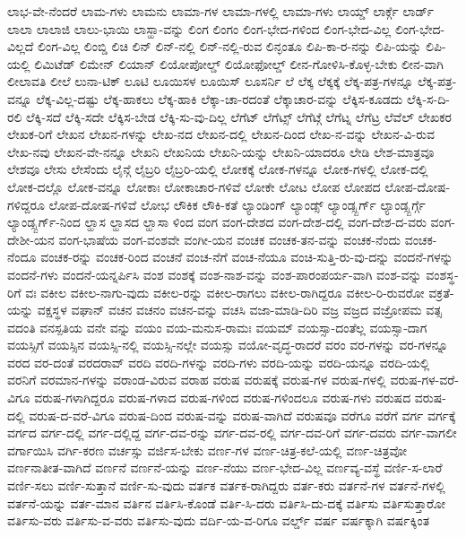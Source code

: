 {ಲಾಭ-ವೇ-ನೆಂದರೆ
ಲಾಮ-ಗಳು
ಲಾಮನು
ಲಾಮಾ-ಗಳ
ಲಾಮಾ-ಗಳಲ್ಲಿ
ಲಾಮಾ-ಗಳು
ಲಾಯ್ಡ್
ಲಾರ್ಕ್ಗೆ
ಲಾರ್ಡ್
ಲಾಲಾ
ಲಾಲಾಜಿ
ಲಾಲು-ಭಾಯಿ
ಲಾಸ್ಹಾ-ವನ್ನು
ಲಿಂಗ
ಲಿಂಗಂ
ಲಿಂಗ-ಭೇದ-ಗಳಿಂದ
ಲಿಂಗ-ಭೇದ-ವಿಲ್ಲ
ಲಿಂಗ-ಭೇದ-ವಿಲ್ಲದೆ
ಲಿಂಗ-ವಿಲ್ಲ
ಲಿಂಬ್ಡಿ
ಲಿಚಿ
ಲಿನ್
ಲಿನ್-ನಲ್ಲಿ
ಲಿನ್-ನಲ್ಲಿ-ರುವ
ಲಿನ್ಳಂತೂ
ಲಿಪಿ-ಕಾ-ರ-ನನ್ನು
ಲಿಪಿ-ಯನ್ನು
ಲಿಪಿ-ಯಲ್ಲಿ
ಲಿಮಿಟೆಡ್
ಲಿಮೇನ್
ಲಿಯಾನ್
ಲಿಯೋಪೋಲ್ಡ್
ಲಿಯೋಫೋಲ್ಡ್
ಲೀನ-ಗೋಳಿಸಿ-ಕೊಳ್ಳ-ಬೇಕು
ಲೀನ-ವಾಗಿ
ಲೀಲಾವತಿ
ಲೀಲೆ
ಲುನಾ-ಟಿಕ್
ಲೂಟಿ
ಲೂಯಿಸಳ
ಲೂಯಿಸ್
ಲೂಸರ್ನಿ
ಲೆ
ಲೆಕ್ಕ
ಲೆಕ್ಕಕ್ಕೆ
ಲೆಕ್ಕ-ಪತ್ರ-ಗಳನ್ನೂ
ಲೆಕ್ಕ-ಪತ್ರ-ವನ್ನೂ
ಲೆಕ್ಕ-ವಿಲ್ಲ-ದಷ್ಟು
ಲೆಕ್ಕ-ಹಾಕಲು
ಲೆಕ್ಕ-ಹಾಕಿ
ಲೆಕ್ಕಾ-ಚಾ-ರದಂತೆ
ಲೆಕ್ಕಾಚಾರ-ವನ್ನು
ಲೆಕ್ಕಿಸ-ಕೂಡದು
ಲೆಕ್ಕಿ-ಸ-ದಿ-ರಲಿ
ಲೆಕ್ಕಿ-ಸದೆ
ಲೆಕ್ಕಿ-ಸದೇ
ಲೆಕ್ಕಿಸ-ಬೇಡ
ಲೆಕ್ಕಿ-ಸು-ವು-ದಿಲ್ಲ
ಲೆಗೆಟ್
ಲೆಗೆಟ್ಸ್
ಲೆಗೆಟ್ಗೆ
ಲೆಗೆಟ್ನ
ಲೆಗೆಟ್ರ
ಲೆವೆಲ್
ಲೇಖಕರ
ಲೇಖಕ-ರಿಗೆ
ಲೇಖನ
ಲೇಖನ-ಗಳನ್ನು
ಲೇಖ-ನದ
ಲೇಖನ-ದಲ್ಲಿ
ಲೇಖನ-ದಿಂದ
ಲೇಖ-ನ-ವನ್ನು
ಲೇಖನ-ವಿ-ರುವ
ಲೇಖ-ನವು
ಲೇಖನ-ವೇ-ನನ್ನೂ
ಲೇಖನಿ
ಲೇಖನಿಯ
ಲೇಖನಿ-ಯನ್ನು
ಲೇಖನಿ-ಯಾದರೂ
ಲೇಡಿ
ಲೇಶ-ಮಾತ್ರವೂ
ಲೇಶವೂ
ಲೇಸು
ಲೇಸೆಂದು
ಲೈನ್ಗೆ
ಲೈಬ್ರರಿ
ಲೈಬ್ರರಿ-ಯಲ್ಲಿ
ಲೋಕಕ್ಕೆ
ಲೋಕ-ಗಳನ್ನೂ
ಲೋಕ-ಗಳಲ್ಲಿ
ಲೋಕ-ದಲ್ಲಿ
ಲೋಕ-ದಲ್ಲೊ
ಲೋಕ-ವನ್ನೂ
ಲೋಕಾಃ
ಲೋಕಾಚಾರ-ಗಳಿವೆ
ಲೋಕೇ
ಲೋಟ
ಲೋಪ
ಲೋಪದ
ಲೋಪ-ದೋಷ-ಗಳಿದ್ದರೂ
ಲೋಪ-ದೋಷ-ಗಳಿವೆ
ಲೋಭ
ಲೌಕಿಕ
ಲೌಕಿ-ಕತೆ
ಲ್ಯಾಂಡಿಂಗ್
ಲ್ಯಾಂಡ್ಸ್
ಲ್ಯಾಂಡ್ಸ್ಬರ್ಗ್
ಲ್ಯಾಂಡ್ಸ್ಬರ್ಗ್ಗೆ
ಲ್ಯಾಂಡ್ಸ್ಬರ್ಗ್-ನಿಂದ
ಲ್ಹಾಸ
ಲ್ಹಾಸದ
ಲ್ಹಾಸಾ
ಳಿಂದ
ವಂಗ
ವಂಗ-ದೇಶದ
ವಂಗ-ದೇಶ-ದಲ್ಲಿ
ವಂಗ-ದೇಶ-ದ-ವರು
ವಂಗ-ದೇಶೀ-ಯನ
ವಂಗ-ಭಾಷೆಯ
ವಂಗ-ವಂಶವೇ
ವಂಗೀ-ಯನ
ವಂಚಕ
ವಂಚಕ-ತನ-ವನ್ನು
ವಂಚಕ-ನೆಂದು
ವಂಚಕ-ನೆಂದೂ
ವಂಚಕ-ರನ್ನು
ವಂಚಕ-ರಿಂದ
ವಂಚನೆ
ವಂಚ-ನೆಗೆ
ವಂಚ-ನೆಯೂ
ವಂಚಿ-ಸುತ್ತಿ-ರು-ವು-ದನ್ನು
ವಂದನೆ-ಗಳನ್ನು
ವಂದನೆ-ಗಳು
ವಂದನೆ-ಯನ್ನರ್ಪಿಸಿ
ವಂಶ
ವಂಶಕ್ಕೆ
ವಂಶ-ನಾಶ-ವನ್ನು
ವಂಶ-ಪಾರಂಪರ್ಯ-ವಾಗಿ
ವಂಶ-ವನ್ನು
ವಂಶಸ್ಥ-ರಿಗೆ
ವಃ
ವಕೀಲ
ವಕೀಲ-ನಾಗು-ವುದು
ವಕೀಲ-ರನ್ನು
ವಕೀಲ-ರಾಗಲು
ವಕೀಲ-ರಾಗಿದ್ದರೂ
ವಕೀಲ-ರಿ-ರುವರೋ
ವಕ್ರತೆ-ಯನ್ನು
ವಕ್ಷಸ್ಥಳ
ವಘಾನ್
ವಚನ
ವಚನಂ
ವಚನ-ವನ್ನು
ವಚಸಿ
ವಜಾ-ಮಾಡಿ-ದಿರಿ
ವಜ್ರ
ವಜ್ರದ
ವಜ್ರೋಪಮ
ವತ್ಸ
ವದಂತಿ
ವನಸ್ಪತಿಯ
ವನೇ
ವನ್ನು
ವಯಂ
ವಯ-ಮನುಸ-ರಾಮಃ
ವಯಮ್
ವಯಸ್ಸಾ-ದಂತೆಲ್ಲ
ವಯಸ್ಸಾ-ದಾಗ
ವಯಸ್ಸಿಗೆ
ವಯಸ್ಸಿನ
ವಯಸ್ಸಿ-ನಲ್ಲಿ
ವಯಸ್ಸಿ-ನಲ್ಲೇ
ವಯಸ್ಸು
ವಯೋ-ವೃದ್ಧ-ರಾದರೆ
ವರಂ
ವರ-ಗಳನ್ನು
ವರ-ಗಳನ್ನೂ
ವರದ
ವರ-ದಂತೆ
ವರದರಾವ್
ವರದಿ
ವರದಿ-ಗಳನ್ನು
ವರದಿ-ಗಳು
ವರದಿ-ಯನ್ನು
ವರದಿ-ಯನ್ನೂ
ವರದಿ-ಯಲ್ಲಿ
ವರನಿಗೆ
ವರಮಾನ-ಗಳನ್ನು
ವರಾಂಡ-ವಿರುವ
ವರಾಹ
ವರುಷ
ವರುಷಕ್ಕೆ
ವರುಷ-ಗಳ
ವರುಷ-ಗಳಲ್ಲಿ
ವರುಷ-ಗಳ-ವರೆ-ವಿಗೂ
ವರುಷ-ಗಳಾಗಿದ್ದರೂ
ವರುಷ-ಗಳಾದ
ವರುಷ-ಗಳಿಂದ
ವರುಷ-ಗಳಿಂದಲೂ
ವರುಷ-ಗಳು
ವರುಷದ
ವರುಷ-ದಲ್ಲಿ
ವರುಷ-ದ-ವರೆ-ವಿಗೂ
ವರುಷ-ದಿಂದ
ವರುಷ-ವನ್ನು
ವರುಷ-ವಾಗಿದೆ
ವರುಷವೂ
ವರೆಗೂ
ವರೆಗೆ
ವರ್ಗ
ವರ್ಗಕ್ಕೆ
ವರ್ಗದ
ವರ್ಗ-ದಲ್ಲಿ
ವರ್ಗ-ದಲ್ಲಿದ್ದ
ವರ್ಗ-ದವ-ರನ್ನು
ವರ್ಗ-ದವ-ರಲ್ಲಿ
ವರ್ಗ-ದವ-ರಿಗೆ
ವರ್ಗ-ದವರು
ವರ್ಗ-ವಾಗಲೀ
ವರ್ಗಾಯಿಸಿ
ವರ್ಗಿ-ಕರಣ
ವರ್ಚಸ್ಸು
ವರ್ಜಿಸ-ಬೇಕು
ವರ್ಣ-ಗಳ
ವರ್ಣ-ಚಿತ್ರ-ಕಲೆ-ಯಲ್ಲಿ
ವರ್ಣ-ಚಿತ್ರವೋ
ವರ್ಣನಾತೀತ-ವಾಗಿದೆ
ವರ್ಣನೆ
ವರ್ಣನೆ-ಯನ್ನು
ವರ್ಣ-ನೆಯು
ವರ್ಣ-ಭೇದ-ವಿಲ್ಲ
ವರ್ಣವ್ಯ-ವಸ್ಥೆ
ವರ್ಣಿ-ಸ-ಲಾರೆ
ವರ್ಣಿ-ಸಲು
ವರ್ಣಿ-ಸುತ್ತಾನೆ
ವರ್ಣಿ-ಸು-ವುದು
ವರ್ತಕ
ವರ್ತಕ-ರಾಗಿದ್ದರು
ವರ್ತ-ಕರು
ವರ್ತನೆ-ಗಳ
ವರ್ತನೆ-ಗಳಲ್ಲಿ
ವರ್ತನೆ-ಯನ್ನು
ವರ್ತ-ಮಾನ
ವರ್ತಿನ
ವರ್ತಿಸಿ-ಕೊಂಡೆ
ವರ್ತಿ-ಸಿ-ದರು
ವರ್ತಿಸಿ-ದು-ದಕ್ಕೆ
ವರ್ತಿಸು
ವರ್ತಿಸುತ್ತಾರೋ
ವರ್ತಿಸು-ವರು
ವರ್ತಿಸು-ವ-ವರು
ವರ್ತಿಸು-ವುದು
ವರ್ದಿ-ಯ-ವ-ರಿಗೂ
ವರ್ಲ್ಡ್
ವರ್ಷ
ವರ್ಷಕ್ಕಾಗಿ
ವರ್ಷಕ್ಕಿಂತ
}
